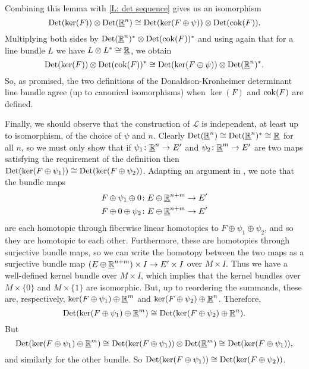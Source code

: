 Combining this lemma with \cref{L: det sequence} gives us an isomorphism
$${\rm Det}(\ker(F)) \otimes {\rm Det}(\underline{\mathbb{R}}^n) \cong {\rm Det}(\ker(F \oplus \psi)) \otimes {\rm Det}({\rm cok}(F)).$$
Multiplying both sides by ${\rm Det}(\underline{\mathbb{R}}^n)^* \otimes {\rm Det}({\rm cok}(F))^*$ and using again that for a line bundle $L$ we have $L \otimes L^* \cong \underline{\mathbb{R}}$, we obtain
$${\rm Det}(\ker(F)) \otimes {\rm Det}({\rm cok}(F))^* \cong {\rm Det}(\ker(F \oplus \psi)) \otimes {\rm Det}(\underline{\mathbb{R}}^n)^*.$$
So, as promised, the two definitions of the Donaldson-Kronheimer determinant line bundle agree (up to canonical isomorphisms) when $\ker(F)$ and ${\rm cok}(F)$ are defined.

Finally, we should observe that the construction of $\mathscr L$ is independent, at least up to isomorphism, of the choice of $\psi$ and $n$.
Clearly ${\rm Det}(\underline{\mathbb{R}}^n) \cong {\rm Det}(\underline{\mathbb{R}}^n)^* \cong \underline{\mathbb{R}}$ for all $n$, so we must only show that if $\psi_1 \colon \underline{\mathbb{R}}^n \to E'$ and $\psi_2 \colon \underline{\mathbb{R}}^m \to E'$ are two maps satisfying the requirement of the definition then ${\rm Det}(\ker(F \oplus \psi_1)) \cong {\rm Det}(\ker(F \oplus \psi_2))$.
Adapting an argument in \cite[Section 5.1.3]{DoKr90}, we note that the bundle maps
\begin{align*}
	F \oplus \psi_1 \oplus 0 \colon &E \oplus \underline{\mathbb{R}}^{n+m} \to E'\\
	F \oplus 0 \oplus \psi_2 \colon &E \oplus \underline{\mathbb{R}}^{n+m} \to E'
\end{align*}
are each homotopic through fiberwise linear homotopies to $F \oplus \psi_1 \oplus \psi_2$, and so they are homotopic to each other.
Furthermore, these are homotopies through surjective bundle maps, so we can write the homotopy between the two maps as a surjective bundle map $(E \oplus \underline{\mathbb{R}}^{n+m}) \times I \to E' \times I$ over $M \times I$.
Thus we have a well-defined kernel bundle over $M \times I$, which implies that the kernel bundles over $M \times \{0\}$ and $M \times \{1\}$ are isomorphic.
But, up to reordering the summands, these are, respectively, $\ker(F \oplus \psi_1) \oplus \underline{\mathbb{R}}^m$ and $\ker(F \oplus \psi_2) \oplus \underline{\mathbb{R}}^n$.
Therefore,
$${\rm Det}(\ker(F \oplus \psi_1) \oplus \underline{\mathbb{R}}^m) \cong {\rm Det}(\ker(F \oplus \psi_2) \oplus \underline{\mathbb{R}}^n).$$
But
$${\rm Det}(\ker(F \oplus \psi_1) \oplus \underline{\mathbb{R}}^m) \cong {\rm Det}(\ker(F \oplus \psi_1)) \otimes {\rm Det}(\underline{\mathbb{R}}^m) \cong {\rm Det}(\ker(F \oplus \psi_1)),$$
and similarly for the other bundle.
So ${\rm Det}(\ker(F \oplus \psi_1)) \cong {\rm Det}(\ker(F \oplus \psi_2))$.